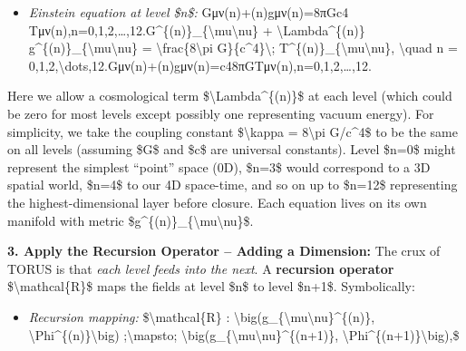\documentclass[
]{article}
\begin{document}
{\begin{itemize}
\item
  \emph{Einstein equation at level \$n\$:}
  Gμν(n)+\Lambda(n)gμν(n)=8πGc4  Tμν(n),n=0,1,2,\ldots,12.G\^{}\{(n)\}\_\{\textbackslash mu\textbackslash nu\}
  + \textbackslash Lambda\^{}\{(n)\}
  g\^{}\{(n)\}\_\{\textbackslash mu\textbackslash nu\} =
  \textbackslash frac\{8\textbackslash pi G\}\{c\^{}4\}\textbackslash;
  T\^{}\{(n)\}\_\{\textbackslash mu\textbackslash nu\},
  \textbackslash quad n =
  0,1,2,\textbackslash dots,12.Gμν(n)\hspace{0pt}+\Lambda(n)gμν(n)\hspace{0pt}=c48πG\hspace{0pt}Tμν(n)\hspace{0pt},n=0,1,2,\ldots,12.
\end{itemize}

Here we allow a cosmological term \$\textbackslash Lambda\^{}\{(n)\}\$
at each level (which could be zero for most levels except possibly one
representing vacuum energy). For simplicity, we take the coupling
constant \$\textbackslash kappa = 8\textbackslash pi G/c\^{}4\$ to be
the same on all levels (assuming \$G\$ and \$c\$ are universal
constants)\hspace{0pt}. Level \$n=0\$ might represent the simplest
``point'' space (0D), \$n=3\$ would correspond to a 3D spatial world,
\$n=4\$ to our 4D space-time, and so on up to \$n=12\$ representing the
highest-dimensional layer before closure. Each equation lives on its own
manifold with metric
\$g\^{}\{(n)\}\_\{\textbackslash mu\textbackslash nu\}\$.

\textbf{3. Apply the Recursion Operator -- Adding a Dimension:} The crux
of TORUS is that \emph{each level feeds into the next}. A
\textbf{recursion operator} \$\textbackslash mathcal\{R\}\$ maps the
fields at level \$n\$ to level \$n+1\$. Symbolically\hspace{0pt}:

\begin{itemize}
\item
  \emph{Recursion mapping:} \$\textbackslash mathcal\{R\} :
  \textbackslash big(g\_\{\textbackslash mu\textbackslash nu\}\^{}\{(n)\},
  \textbackslash Phi\^{}\{(n)\}\textbackslash big)
  ;\textbackslash mapsto;
  \textbackslash big(g\_\{\textbackslash mu\textbackslash nu\}\^{}\{(n+1)\},
  \textbackslash Phi\^{}\{(n+1)\}\textbackslash big),\$
\end{itemize}

}
\end{document}
